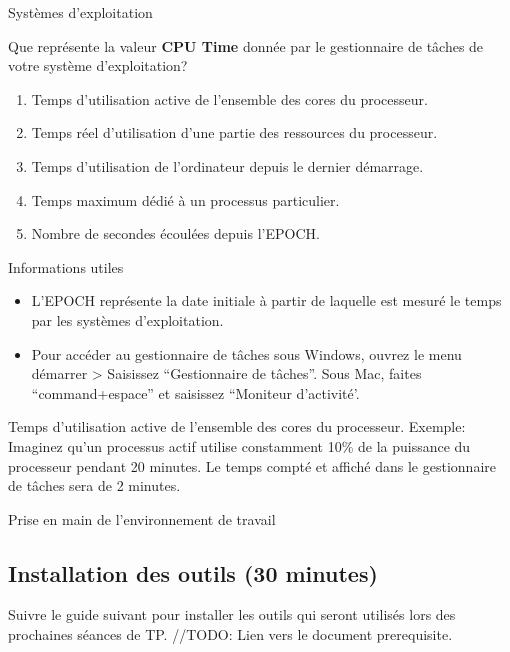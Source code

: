 \begin{section}{Systèmes d'exploitation}
    \begin{Exercice}[5 minutes]
        Que représente la valeur \textbf{CPU Time} donnée par le gestionnaire de tâches de votre système d'exploitation?
        \begin{enumerate}
            \item Temps d'utilisation active de l'ensemble des cores du processeur.
            \item Temps réel d'utilisation d'une partie des ressources du processeur.
            \item Temps d'utilisation de l'ordinateur depuis le dernier démarrage.
            \item Temps maximum dédié à un processus particulier.
            \item Nombre de secondes écoulées depuis l'EPOCH.
        \end{enumerate}
        \begin{Example}{\faLightbulb \quad Informations utiles}
            \begin{itemize}
                \item L'EPOCH représente la date initiale à partir de laquelle est mesuré le temps par les systèmes d'exploitation.
                \item Pour accéder au gestionnaire de tâches sous Windows, ouvrez le menu démarrer > Saisissez ``Gestionnaire de tâches''. Sous Mac, faites ``command+espace'' et saisissez ``Moniteur d'activité'.
            \end{itemize}
            
        \end{Example}
        \begin{solution}
            Temps d'utilisation active de l'ensemble des cores du processeur.
            Exemple: Imaginez qu'un processus actif utilise constamment 10\% de la puissance du processeur pendant 20 minutes. Le temps compté et affiché dans le gestionnaire de tâches sera de 2 minutes.
        \end{solution}
    \end{Exercice}
\end{section}

\begin{section}{Prise en main de l'environnement de travail}
    \subsection{Installation des outils (30 minutes)}
        Suivre le guide suivant pour installer les outils qui seront utilisés lors des prochaines séances de TP. //TODO: Lien vers le document prerequisite.
\end{section}

